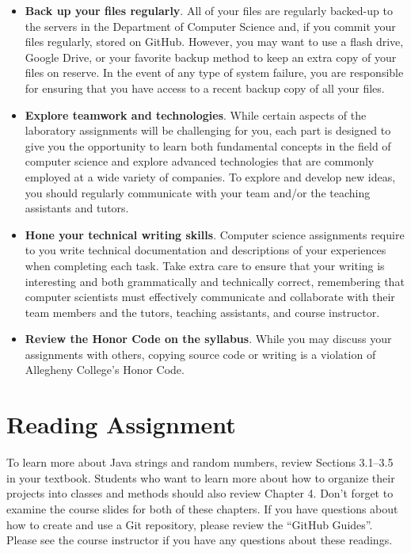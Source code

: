 \documentclass[11pt]{article}
\begin{document}
\begin{itemize}
\item {\bf Back up your files regularly}. All of your files are regularly
  backed-up to the servers in the Department of Computer Science and, if you
  commit your files regularly, stored on GitHub. However, you may want to use a
  flash drive, Google Drive, or your favorite backup method to keep an extra
  copy of your files on reserve. In the event of any type of system failure, you
  are responsible for ensuring that you have access to a recent backup copy of
  all your files.

\item {\bf Explore teamwork and technologies}. While certain aspects of the
  laboratory assignments will be challenging for you, each part is designed to
  give you the opportunity to learn both fundamental concepts in the field of
  computer science and explore advanced technologies that are commonly employed
  at a wide variety of companies. To explore and develop new ideas, you should
  regularly communicate with your team and/or the teaching assistants and
  tutors.

\item {\bf Hone your technical writing skills}. Computer science assignments
  require to you write technical documentation and descriptions of your
  experiences when completing each task. Take extra care to ensure that your
  writing is interesting and both grammatically and technically correct,
  remembering that computer scientists must effectively communicate and
  collaborate with their team members and the tutors, teaching assistants, and
  course instructor.

\item {\bf Review the Honor Code on the syllabus}. While you may discuss your
  assignments with others, copying source code or writing is a violation of
  Allegheny College's Honor Code.

\end{itemize}

\section*{Reading Assignment}

To learn more about Java strings and random numbers, review Sections 3.1--3.5 in
your textbook. Students who want to learn more about how to organize their
projects into classes and methods should also review Chapter 4. Don't forget to
examine the course slides for both of these chapters. If you have questions
about how to create and use a Git repository, please review the ``GitHub
Guides''. Please see the course instructor if you have any questions about these
readings.
\end{document}
